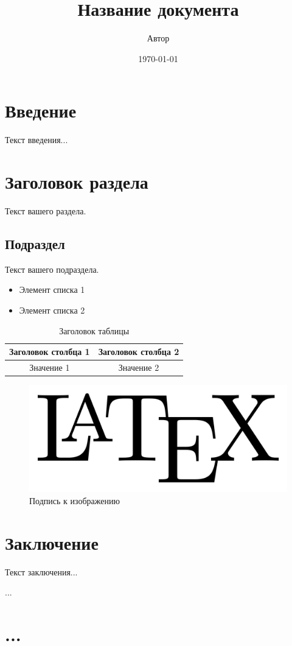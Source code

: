 \documentclass{article}
\begin{document}
\title{Название документа}
\author{Автор}
\date{\today} %

\maketitle

\section{Введение}
Текст введения...

\section{Заголовок раздела}
Текст вашего раздела.

\subsection{Подраздел}
Текст вашего подраздела.

\begin{itemize}
  \item Элемент списка 1
  \item Элемент списка 2
\end{itemize}

\begin{table}
  \caption{Заголовок таблицы}
  \begin{tabular}{|c|c|}
    \hline
    Заголовок столбца 1 & Заголовок столбца 2 \\
    \hline
    Значение 1 & Значение 2 \\
    \hline
  \end{tabular}
\end{table}

\begin{figure}
  \includegraphics[width=\textwidth]{your-image.png}
  \caption{Подпись к изображению}
\end{figure}

\section{Заключение}
Текст заключения...

\begin{thebibliography}{99}
   ...
 \end{thebibliography}

 \appendix
\section{...}

\end{document}
